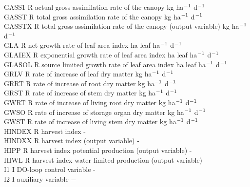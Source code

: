 \begin{tabbing}
GASS1   \> \> R   \> actual gross assimilation rate of the canopy \> \> \> \> \> \> \> kg ha$^{{\rm -1}}$ d$^{{\rm -1}}$\\
GASST\> \> R\> total gross assimilation rate of the canopy \> \> \> \> \> \> \> kg ha$^{{\rm -1}}$ d$^{{\rm -1}}$\\
GASSTX\> \> R\> total gross assimilation rate of the canopy (output variable) \> \> \> \> \> \> \> kg ha$^{{\rm -1}}$ d$^{{\rm -1}}$\\
GLA\> \> R\> net growth rate of leaf area index\> \> \> \> \> \> \> ha leaf ha$^{{\rm -1}}$ d$^{{\rm -1}}$\\
GLAIEX\> \> R\> exponential growth rate of leaf area index\> \> \> \> \> \> \> ha leaf ha$^{{\rm -1}}$ d$^{{\rm -1}}$\\
GLASOL\> \> R\> source limited growth rate of leaf area index\> \> \> \> \> \> \> ha leaf ha$^{{\rm -1}}$ d$^{{\rm -1}}$\\
GRLV    \> \> R   \> rate of increase of leaf dry matter          \> \> \> \> \> \> \> kg ha$^{{\rm -1}}$ d$^{{\rm -1}}$\\
GRRT    \> \> R   \> rate of increase of root dry matter                \> \> \> \> \> \> \> kg ha$^{{\rm -1}}$ d$^{{\rm -1}}$\\
GRST    \> \> R   \> rate of increase of stem dry matter                \> \> \> \> \> \> \> kg ha$^{{\rm -1}}$ d$^{{\rm -1}}$\\
GWRT    \> \> R   \> rate of increase of living root dry matter         \> \> \> \> \> \> \> kg ha$^{{\rm -1}}$ d$^{{\rm -1}}$\\
GWSO    \> \> R   \> rate of increase of storage organ dry matter       \> \> \> \> \> \> \> kg ha$^{{\rm -1}}$ d$^{{\rm -1}}$\\
GWST    \> \> R   \> rate of increase of living stem dry matter         \> \> \> \> \> \> \> kg ha$^{{\rm -1}}$ d$^{{\rm -1}}$\\
HINDEX\> \> R\> harvest index\> \> \> \> \> \> \> -\\
HINDXX\> \> R\> harvest index (output variable)\> \> \> \> \> \> \> -\\
HIPP\> \> R\> harvest index potential production (output variable)\> \> \> \> \> \> \> -\\
HIWL\> \> R\> harvest index water limited production (output variable)\\
I1\> \> I\> DO-loop control variable\> \> \> \> \> \> \> -\\
I2      \> \> I   \> auxiliary variable                                 \> \> \> \> \> \> \> $-$\\

\end{tabbing}
